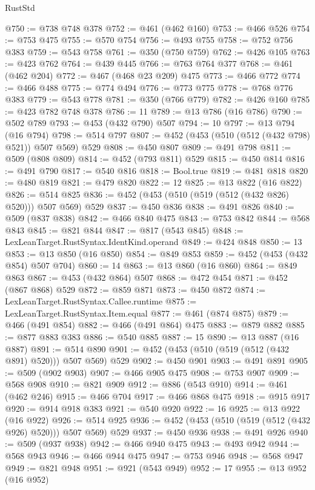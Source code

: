 \begin{lexlean}{RustStd}
\begin{coremodule}
@750 := @738 @748 @378
@752 := @461 (@462 @160)
@753 := @466 @526
@754 := @753 @475
@755 := @570 @754
@756 := @493 @755
@758 := @752 @756 @383
@759 := @543 @758
@761 := @350 (@750 @759)
@762 := @426 @105
@763 := @423 @762
@764 := @439 @445
@766 := @763 @764 @377
@768 := @461 (@462 @204)
@772 := @467 (@468 @23 @209) @475
@773 := @466 @772
@774 := @466 @488
@775 := @774 @494
@776 := @773 @775
@778 := @768 @776 @383
@779 := @543 @778
@781 := @350 (@766 @779)
@782 := @426 @160
@785 := @423 @782 @748 @378
@786 := 11
@789 := @13 @786 (@16 @786)
@790 := @502 @789
@793 := @453 (@432 @790) @507
@794 := 10
@797 := @13 @794 (@16 @794)
@798 := @514 @797
@807 := @452 (@453 (@510 (@512 (@432 @798) @521)) @507 @569) @529
@808 := @450 @807
@809 := @491 @798
@811 := @509 (@808 @809)
@814 := @452 (@793 @811) @529
@815 := @450 @814
@816 := @491 @790
@817 := @540 @816
@818 := Bool.true
@819 := @481 @818
@820 := @480 @819
@821 := @479 @820
@822 := 12
@825 := @13 @822 (@16 @822)
@826 := @514 @825
@836 := @452 (@453 (@510 (@519 (@512 (@432 @826) @520))) @507 @569) @529
@837 := @450 @836
@838 := @491 @826
@840 := @509 (@837 @838)
@842 := @466 @840 @475
@843 := @753 @842
@844 := @568 @843
@845 := @821 @844
@847 := @817 (@543 @845)
@848 := LexLeanTarget.RustSyntax.IdentKind.operand
@849 := @424 @848
@850 := 13
@853 := @13 @850 (@16 @850)
@854 := @849 @853
@859 := @452 (@453 (@432 @854) @507 @704)
@860 := 14
@863 := @13 @860 (@16 @860)
@864 := @849 @863
@867 := @453 (@432 @864) @507
@868 := @472 @454
@871 := @452 (@867 @868) @529
@872 := @859 @871
@873 := @450 @872
@874 := LexLeanTarget.RustSyntax.Callee.runtime
@875 := LexLeanTarget.RustSyntax.Item.equal
@877 := @461 (@874 @875)
@879 := @466 (@491 @854)
@882 := @466 (@491 @864) @475
@883 := @879 @882
@885 := @877 @883 @383
@886 := @540 @885
@887 := 15
@890 := @13 @887 (@16 @887)
@891 := @514 @890
@901 := @452 (@453 (@510 (@519 (@512 (@432 @891) @520))) @507 @569) @529
@902 := @450 @901
@903 := @491 @891
@905 := @509 (@902 @903)
@907 := @466 @905 @475
@908 := @753 @907
@909 := @568 @908
@910 := @821 @909
@912 := @886 (@543 @910)
@914 := @461 (@462 @246)
@915 := @466 @704
@917 := @466 @868 @475
@918 := @915 @917
@920 := @914 @918 @383
@921 := @540 @920
@922 := 16
@925 := @13 @922 (@16 @922)
@926 := @514 @925
@936 := @452 (@453 (@510 (@519 (@512 (@432 @926) @520))) @507 @569) @529
@937 := @450 @936
@938 := @491 @926
@940 := @509 (@937 @938)
@942 := @466 @940 @475
@943 := @493 @942
@944 := @568 @943
@946 := @466 @944 @475
@947 := @753 @946
@948 := @568 @947
@949 := @821 @948
@951 := @921 (@543 @949)
@952 := 17
@955 := @13 @952 (@16 @952)

\end{coremodule}
\end{lexlean}

